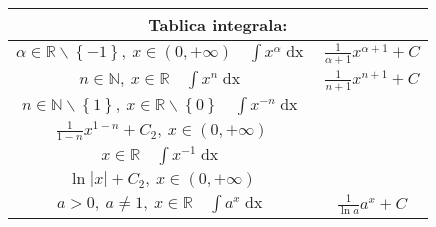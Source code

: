 \documentclass{article}
\DeclareMathOperator{\dx}{dx}
\begin{document}
\setlength{\tabcolsep}{2.5em}
\renewcommand{\arraystretch}{2.5}
\begin{tabular}{ |c|c| }
    \hline
    \multicolumn{2}{|c|}{Tablica integrala:}                                                                                                                                                                                                        \\ \hline
    $\displaystyle\alpha \in \mathbb{R} \backslash \left\{-1\right\},\ x\in\left(0, +\infty\right)\quad \int x^{\alpha} \dx$                   & $\displaystyle\frac{1}{\alpha + 1} x^{\alpha + 1} + C$                                             \\ \hline
    $\displaystyle n \in \mathbb{N},\ x \in \mathbb{R} \quad \int x^{n} \dx$                                                                   & $\displaystyle\frac{1}{n + 1} x^{n + 1} + C$                                                       \\ \hline
    $\displaystyle n \in \mathbb{N}\backslash\left\{1\right\},\ x \in\mathbb{R}\backslash\left\{0\right\}\quad \int x^{-n} \dx $               &
    \makecell{
    $\displaystyle\frac{1}{1-n} x^{1-n} + C_1,\ x \in \left(-\infty, 0\right)$                                                                                                                                                                      \\
        $\displaystyle\frac{1}{1-n} x^{1-n} + C_2,\ x \in \left(0, +\infty\right)$
    }                                                                                                                                                                                                                                               \\  \hline
    $\displaystyle x \in \mathbb{R} \quad \int x^{-1} \dx$                                                                                     &
    \makecell{ $\ln |x| + C_1,\ x \in \left(-\infty, 0\right)$                                                                                                                                                                                      \\
    $\displaystyle\ln |x| + C_2,\ x \in \left(0, +\infty\right)$}                                                                                                                                                                                   \\ \hline
    $\displaystyle a > 0,\ a\neq 1,\ x \in \mathbb{R} \quad \int a^x \dx$                                                                      & $ \displaystyle\frac{1}{\ln a} a^x + C$                                                            \\ \hline

\end{tabular}
\end{document}
